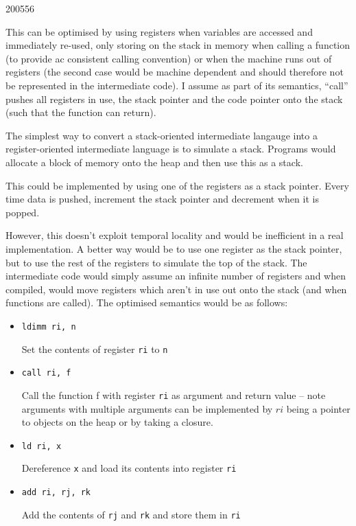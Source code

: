 \documentclass[10pt,\jkfside,a4paper]{article}
\begin{document}
\begin{examquestion}{2005}{5}{6}
\begin{enumerate}
\begin{enumerate}
This can be optimised by using registers when variables are accessed and
immediately re-used, only storing on the stack in memory when calling a
function (to provide ac consistent calling convention) or when the machine
runs out of registers (the second case would be machine dependent and
should therefore not be represented in the intermediate code). I assume as
part of its semantics,  ``call'' pushes all registers in use, the stack
pointer and the code pointer onto the stack (such that the function can
return).

\fi

The simplest way to convert a stack-oriented intermediate langauge into a
register-oriented intermediate language is to simulate a stack. Programs
would allocate a block of memory onto the heap and then use this as a stack.

This could be implemented by using one of the registers as a stack pointer.
Every time data is pushed, increment the stack pointer and decrement when
it is popped.

However, this doesn't exploit temporal locality and would be inefficient in
a real implementation. A better way would be to use one register as the
stack pointer, but to use the rest of the registers to simulate the top of
the stack. The intermediate code would simply assume an infinite number of
registers and when compiled, would move registers which aren't in use out
onto the stack (and when functions are called). The optimised semantics
would be as follows:

\begin{itemize}

\item \texttt{ldimm ri, n}

Set the contents of register \texttt{ri} to \texttt{n}

\item \texttt{call ri, f}

Call the function f with register \texttt{ri} as argument and return value
-- note arguments with multiple arguments can be implemented by $ri$ being a
pointer to objects on the heap or by taking a closure.

\item \texttt{ld ri, x}

Dereference \texttt{x} and load its contents into register \texttt{ri}

\item \texttt{add ri, rj, rk}

Add the contents of \texttt{rj} and \texttt{rk} and store them in \texttt{ri}


\end{itemize}
\end{enumerate}
\end{enumerate}
\end{examquestion}
\end{document}
